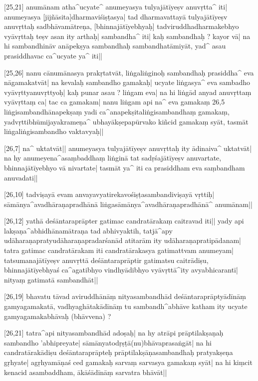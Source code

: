 

[25,21] anumānam atha^ucyate^ anumeyasya tulyajātīyeṣv anuvṛtta^ iti| anumeyasya [jijñāsita]dharmaviśiṣṭasya| tad dharmavattayā tulyajātīyeṣv anuvṛttaḥ sadbhāvamātreṇa, [bhinnajātīyebhyaḥ] tadviruddhadharmakebhyo vyāvṛttaḥ teṣv asan ity arthaḥ| sambandha^ iti| kaḥ sambandhaḥ ? kayor vā| na hi sambandhināv anāpekṣya sambandhaḥ sambandhatāmiyāt, yad^ asau 
prasiddhavac ca^ucyate ya^ iti||

[25,26] nanu cānumānasya prakṛtatvāt, liṅgaliṅginoḥ sambandhaḥ 
prasiddha^ eva nāgamakatvāt| na kevalaḥ sambandho gamakaḥ| ucyate liṅgasya^ eva sambadho vyāvṛttyanuvṛttyoḥ| kaḥ punar asau ? liṅgam eva| na hi liṅgād anyad anuvṛttaṃ vyāvṛttaṃ ca| tac ca gamakam| nanu liṅgam api na^ eva gamakaṃ 26,5 liṅgisambandhānapekṣaṃ yadi ca^anapekṣitaliṅgisambandhaṃ gamakaṃ, yadvṛttibhūmijayakrameṇa^ ubhayākṣepapūrvako kiñcid gamakaṃ syāt, tasmāt liṅgaliṅgisambandho vaktavyaḥ||

[26,7] na^ uktatvāt|| anumeyasya tulyajātīyeṣv anuvṛttaḥ ity ādinaiva^ uktatvāt| na hy anumeyena^asaṃbaddhaṃ liṅginā tat sadṛśajātīyeṣv anuvartate, bhinnajātīyebhyo vā nivartate| tasmāt ya^ iti ca prasiddham eva saṃbandham anuvadati||

[26,10] tadviṣayā evam anvayavyatirekavośiṣṭasambandiviṣayā vṛttiḥ| sāmānya^avadhāraṇapradhānā liṅgasāmānya^avadhāraṇapradhānā^ anumānam||

[26,12] yathā deśāntaraprāpter gatimac candratārakaṃ caitravad iti|| yady api lakṣaṇa^abhidhānamātraṇa tad abhivyaktih, tatjā^apy udāharaṇapratyudāharaṇapradarśanād atitarām ity udāharaṇapratipādanam| tatra gatimac candratārakam iti candratārakasya gatimattvam anumeyam| tatsumanajātīyeṣv anuvṛttā deśāntaraprāptir gatimatsu caitrādiṣu, bhinnajātīyebhyaś ca^agatibhyo vindhyādibhyo vyāvṛttā^ity avyabhicarantī| nityaṃ gatimatā sambandhāt||

[26,19] bhavatu tāvad aviruddhānāṃ nityasambandhād deśāntaraprāptyādīnāṃ gamyagamakatā, vadhyaghātakādīnāṃ tu sambandh^abhāve katham ity ucyate gamyagamakabhāvaḥ (bhāvvena) ?

[26,21] tatra^api nityasambandhād adoṣaḥ| na hy atrāpi prāptilakṣaṇaḥ sambandho 'abhipreyate| sāmānyatodṛṣṭā(nu)bhāvaprasaṅgāt| na hi candratārakādiṣu deśāntaraprāpteḥ prāptilakṣāṇasambandhaḥ 
pratyakṣeṇa gṛhyate| agṛhyamāṇaś ced gamakaḥ sarvaṃ sarvasya gamakaṃ syāt| na hi kiṃcit kenacid asambaddham, ākāśādīnāṃ sarvatra bhāvāt||

